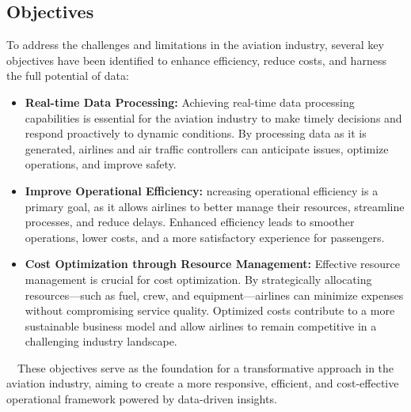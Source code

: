 \documentclass[12pt, a4paper]{article}
\begin{document}
    \subsection{Objectives}
    To address the challenges and limitations in the aviation industry, several
    key objectives have been identified to enhance efficiency, reduce costs, and
    harness the full potential of data:
    \begin{itemize}
        \item \textbf{Real-time Data Processing:} Achieving real-time data
        processing capabilities is essential for the aviation industry to make
        timely decisions and respond proactively to dynamic conditions. By
        processing data as it is generated, airlines and air traffic controllers
        can anticipate issues, optimize operations, and improve safety.
        \item \textbf{Improve Operational Efficiency:} ncreasing operational
        efficiency is a primary goal, as it allows airlines to better manage
        their resources, streamline processes, and reduce delays. Enhanced
        efficiency leads to smoother operations, lower costs, and a more
        satisfactory experience for passengers.
        \item \textbf{Cost Optimization through Resource Management:} Effective
        resource management is crucial for cost optimization. By strategically
        allocating resources—such as fuel, crew, and equipment—airlines can
        minimize expenses without compromising service quality. Optimized costs
        contribute to a more sustainable business model and allow airlines to
        remain competitive in a challenging industry landscape.

    \end{itemize}
    $\quad$These objectives serve as the foundation for a transformative
    approach in the aviation industry, aiming to create a more responsive,
    efficient, and cost-effective operational framework powered by data-driven
    insights.
\end{document}
